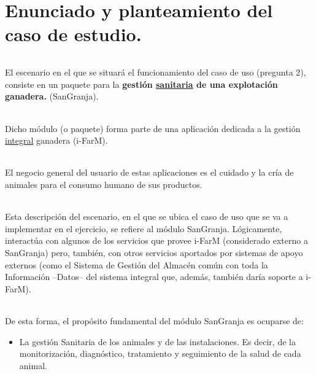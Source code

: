 \documentclass[a4paper]{article}
\begin{document}
	
	\newpage

	
	
	
	\tableofcontents %
	
	
	\listoffigures %
	\pagebreak
	
\part{Enunciado y planteamiento del caso de estudio.}
\paragraph{}El escenario en el que se situará el funcionamiento del caso de uso (pregunta 2), consiste en un paquete para la \textbf{gestión \underline{sanitaria} de una explotación ganadera.} (SanGranja).
\paragraph{}Dicho módulo (o paquete) forma parte de una aplicación dedicada a la gestión \underline{integral} ganadera (i-FarM).
\paragraph{}El negocio general del usuario de estas aplicaciones es el cuidado y la cría de animales para el consumo humano de sus productos.
\paragraph{}Esta descripción del escenario, en el que se ubica el caso de uso que se va a implementar en el ejercicio, se refiere al módulo {\large SanGranja}. Lógicamente, interactúa con algunos de los servicios que provee {\large i-FarM} (considerado externo a {\large SanGranja}) pero, también, con otros servicios aportados por sistemas de apoyo externos (como el Sistema de Gestión del Almacén común con toda la Información –Datos– del sistema integral que, además, también daría soporte a {\large i-FarM}).



\paragraph{}De esta forma, el propósito fundamental del módulo {\large SanGranja} es ocuparse de:
\begin{itemize}
	\item La gestión {\large Sanitaria}  de los animales y de las instalaciones. Es decir, de la monitorización, diagnóstico, {\large tratamiento} y seguimiento de la salud de cada animal.
\end{itemize}
\end{document}
